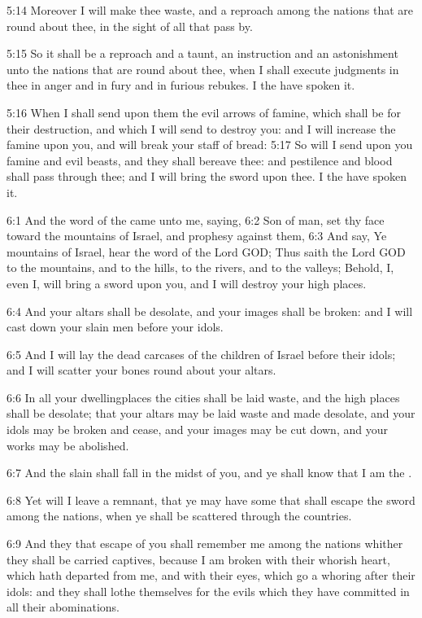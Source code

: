 5:14 Moreover I will make thee waste, and a reproach among the nations that are round about thee, in the sight of all that pass by.

5:15 So it shall be a reproach and a taunt, an instruction and an astonishment unto the nations that are round about thee, when I shall execute judgments in thee in anger and in fury and in furious rebukes.  I the \LORD have spoken it.

5:16 When I shall send upon them the evil arrows of famine, which shall be for their destruction, and which I will send to destroy you: and I will increase the famine upon you, and will break your staff of bread: 5:17 So will I send upon you famine and evil beasts, and they shall bereave thee: and pestilence and blood shall pass through thee; and I will bring the sword upon thee. I the \LORD have spoken it.

6:1 And the word of the \LORD came unto me, saying, 6:2 Son of man, set thy face toward the mountains of Israel, and prophesy against them, 6:3 And say, Ye mountains of Israel, hear the word of the Lord GOD; Thus saith the Lord GOD to the mountains, and to the hills, to the rivers, and to the valleys; Behold, I, even I, will bring a sword upon you, and I will destroy your high places.

6:4 And your altars shall be desolate, and your images shall be broken: and I will cast down your slain men before your idols.

6:5 And I will lay the dead carcases of the children of Israel before their idols; and I will scatter your bones round about your altars.

6:6 In all your dwellingplaces the cities shall be laid waste, and the high places shall be desolate; that your altars may be laid waste and made desolate, and your idols may be broken and cease, and your images may be cut down, and your works may be abolished.

6:7 And the slain shall fall in the midst of you, and ye shall know that I am the \LORD.

6:8 Yet will I leave a remnant, that ye may have some that shall escape the sword among the nations, when ye shall be scattered through the countries.

6:9 And they that escape of you shall remember me among the nations whither they shall be carried captives, because I am broken with their whorish heart, which hath departed from me, and with their eyes, which go a whoring after their idols: and they shall lothe themselves for the evils which they have committed in all their abominations.

